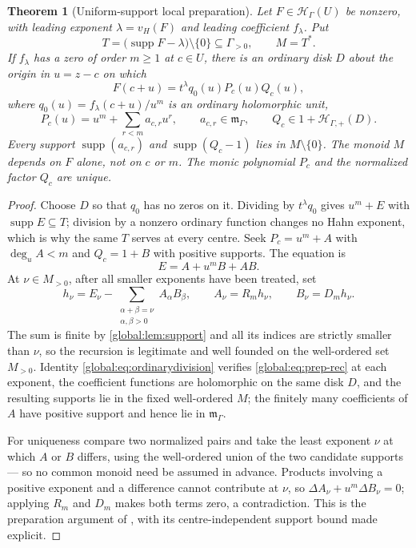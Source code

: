 \documentclass[11pt,letterpaper]{article}
\newtheorem{theorem}{Theorem}[section]
\theoremstyle{definition}
\theoremstyle{remark}
\newcommand{\HH}{\mathscr H_\Gamma}
\newcommand{\HP}{\mathscr H_{\Gamma,+}}
\newcommand{\mK}{\mathfrak m_\Gamma}
\newcommand{\supp}{\operatorname{supp}}
\numberwithin{equation}{section}
\begin{document}
\begin{theorem}[Uniform-support local preparation]\label{global:thm:preparation}
Let $F\in\HH(U)$ be nonzero, with leading exponent $\lambda=v_H(F)$ and leading coefficient $f_\lambda$. Put
\[
  T=\bigl(\supp F-\lambda\bigr)\setminus\{0\}\subseteq\Gamma_{>0},
  \qquad M=T^* .
\]
If $f_\lambda$ has a zero of order $m\ge1$ at $c\in U$, there is an ordinary disk $D$ about the origin in $u=z-c$ on which
\begin{equation}\label{global:eq:prep}
  F(c+u)=t^\lambda q_0(u)P_c(u)Q_c(u),
\end{equation}
where $q_0(u)=f_\lambda(c+u)/u^m$ is an ordinary holomorphic unit,
\[
  P_c(u)=u^m+\sum_{r<m}a_{c,r}u^r,\qquad a_{c,r}\in\mK,
  \qquad Q_c\in1+\HP(D).
\]
Every support $\supp(a_{c,r})$ and $\supp(Q_c-1)$ lies in $M\setminus\{0\}$. The monoid $M$ depends on $F$ alone, not on $c$ or $m$. The monic polynomial $P_c$ and the normalized factor $Q_c$ are unique.
\end{theorem}

\begin{proof}
Choose $D$ so that $q_0$ has no zeros on it. Dividing by $t^\lambda q_0$ gives $u^m+E$ with $\supp E\subseteq T$; division by a nonzero ordinary function changes no Hahn exponent, which is why the same $T$ serves at every centre. Seek $P_c=u^m+A$ with $\deg_uA<m$ and $Q_c=1+B$ with positive supports. The equation is
\begin{equation}\label{global:eq:prep-rec}
  E=A+u^mB+AB .
\end{equation}
At $\nu\in M_{>0}$, after all smaller exponents have been treated, set
\begin{equation}\label{global:eq:prepsteps}
  h_\nu=E_\nu-\sum_{\substack{\alpha+\beta=\nu\\ \alpha,\beta>0}}A_\alpha B_\beta,
  \qquad A_\nu=R_mh_\nu,\qquad B_\nu=D_mh_\nu .
\end{equation}
The sum is finite by \cref{global:lem:support} and all its indices are strictly smaller than $\nu$, so the recursion is legitimate and well founded on the well-ordered set $M_{>0}$. Identity \eqref{global:eq:ordinarydivision} verifies \eqref{global:eq:prep-rec} at each exponent, the coefficient functions are holomorphic on the same disk $D$, and the resulting supports lie in the fixed well-ordered $M$; the finitely many coefficients of $A$ have positive support and hence lie in $\mK$.

For uniqueness compare two normalized pairs and take the least exponent $\nu$ at which $A$ or $B$ differs, using the well-ordered union of the two candidate supports --- so no common monoid need be assumed in advance. Products involving a positive exponent and a difference cannot contribute at $\nu$, so $\Delta A_\nu+u^m\Delta B_\nu=0$; applying $R_m$ and $D_m$ makes both terms zero, a contradiction. This is the preparation argument of \cite[\S7]{Source}, with its centre-independent support bound made explicit.
\end{proof}
\end{document}
